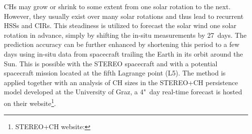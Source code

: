 CHs may grow or shrink to some extent from one solar rotation to the next. However, they usually exist over many solar rotations and thus lead to recurrent HSSs and CIRs. This steadiness is utilized to forecast the solar wind one solar rotation in advance, simply by shifting the in-situ measurements by 27~days. The prediction accuracy can be further enhanced by shortening this period to a few days using in-situ data from spacecraft trailing the Earth in its orbit around the Sun. This is possible with the STEREO spacecraft and with a potential spacecraft mission located at the fifth Lagrange point (L5). The method is applied together with an analysis of CH sizes in the STEREO+CH persistence model \citep{Temmer2018} developed at the University of Graz, a 4"~day real-time forecast is hosted on their website\footnote{STEREO+CH website: }.

